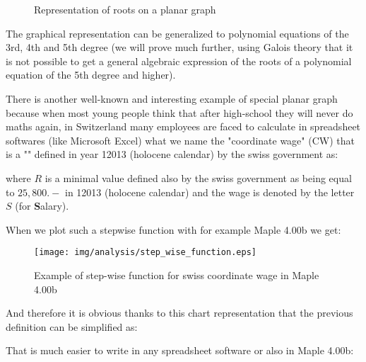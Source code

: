 \begin{figure}[H]
		\vspace*{3mm}
		\caption{Representation of roots on a planar graph}
	\end{figure}
	The graphical representation can be generalized to polynomial equations of the 3rd, 4th and 5th degree (we will prove much further, using Galois theory that it is not possible to get a general algebraic expression of the roots of a polynomial equation of the 5th degree and higher).

	There is another well-known and interesting example of special planar graph because when most young people think that after high-school they will never do maths again, in Switzerland many employees are faced to calculate in spreadsheet softwares (like Microsoft Excel) what we name the "coordinate wage" (CW) that is a "" defined in year 12013 (holocene calendar) by the swiss government as:
	
	where $R$ is a minimal value defined also by the swiss government as being equal to $25,800.-$ in 12013 (holocene calendar) and the wage is denoted by the letter $S$ (for \textbf{S}alary).

	When we plot such a stepwise function with for example Maple 4.00b we get:

	\begin{figure}[H]
		\centering
		\texttt{[image: img/analysis/step\_wise\_function.eps]}
		\caption{Example of step-wise function for swiss coordinate wage in Maple 4.00b}
	\end{figure}

	And therefore it is obvious thanks to this chart representation that the previous definition can be simplified as:

	

	That is much easier to write in any spreadsheet software or also in Maple 4.00b:

